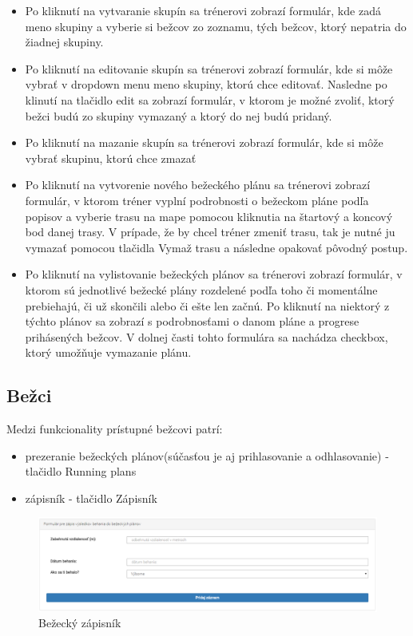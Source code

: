 \documentclass[12pt,a4paper]{report}
\theoremstyle{definition}
\theoremstyle{remark}
\begin{document}
\begin{itemize}
\item Po kliknutí na vytvaranie skupín sa trénerovi zobrazí formulár, kde zadá meno skupiny a vyberie si bežcov zo zoznamu, tých bežcov, ktorý nepatria do žiadnej skupiny.
\item Po kliknutí na editovanie skupín sa trénerovi zobrazí formulár, kde si môže vybrať v dropdown menu meno skupiny, ktorú chce editovať. Nasledne po klinutí na tlačidlo edit sa zobrazí formulár, v ktorom je možné zvoliť, ktorý bežci budú zo skupiny vymazaný a ktorý do nej budú pridaný.
\item Po kliknutí na mazanie skupín sa trénerovi zobrazí formulár, kde si môže vybrať skupinu, ktorú chce zmazať
\item Po kliknutí na vytvorenie nového bežeckého plánu sa trénerovi zobrazí formulár, v ktorom tréner vyplní podrobnosti o bežeckom pláne podľa popisov a vyberie trasu na mape pomocou kliknutia na štartový a koncový bod danej trasy. V prípade, že by chcel tréner zmeniť trasu, tak je nutné ju vymazať pomocou tlačidla Vymaž trasu a následne opakovať pôvodný postup.
\item  Po kliknutí na vylistovanie bežeckých plánov sa trénerovi zobrazí formulár, v ktorom sú jednotlivé bežecké plány rozdelené podľa toho či momentálne prebiehajú, či už skončili alebo či ešte len začnú. Po kliknutí na niektorý z týchto plánov sa zobrazí s podrobnosťami o danom pláne a progrese prihásených bežcov. V dolnej časti tohto formulára sa nachádza checkbox, ktorý umožňuje vymazanie plánu.
\end{itemize}
\subsection{Bežci}
Medzi funkcionality prístupné bežcovi patrí:
\begin{itemize}
\item prezeranie bežeckých plánov(súčasťou je aj prihlasovanie a odhlasovanie) - tlačidlo Running plans
\item zápisník - tlačidlo Zápisník
\end{itemize}

\begin{figure}[H]
\centering
\includegraphics[width=\textwidth]{zapisnik.png}
\caption{Bežecký zápisník \label{zapisnik}}
\end{figure}
\end{document}
